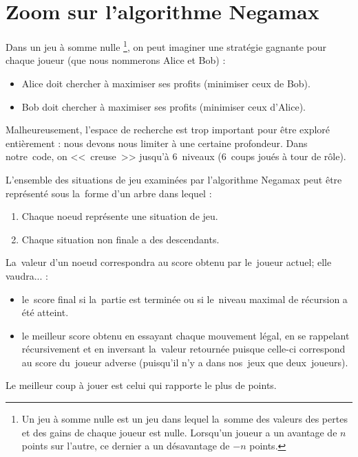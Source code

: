 \section{Zoom sur l'algorithme Negamax}

Dans un jeu à somme nulle
\footnote{Un jeu à somme nulle est un jeu dans lequel la~somme des valeurs des pertes et des gains de chaque joueur est nulle. Lorsqu'un joueur a un avantage de $n$ points sur l'autre, ce dernier a un désavantage de $-n$ points.}, 
on peut imaginer une stratégie gagnante pour chaque joueur (que nous nommerons Alice et Bob) : 
\begin{itemize}
	\item Alice doit chercher à maximiser ses profits (minimiser ceux de Bob).
	\item Bob doit chercher à maximiser ses profits (minimiser ceux d'Alice).
\end{itemize}

Malheureusement, l'espace de recherche est trop important pour être exploré entièrement : 
nous devons nous limiter à une certaine profondeur. Dans notre~code, on <<~creuse~>> jusqu'à 
6~niveaux (6~coups joués à tour de rôle).

L'ensemble des situations de jeu examinées par l'algorithme Negamax 
peut être représenté sous la~forme d'un arbre dans lequel :
\begin{enumerate}
	\item Chaque noeud représente une situation de jeu.
    \item Chaque situation non finale a des descendants.
\end{enumerate}

La~valeur d'un noeud correspondra au score obtenu par le~joueur actuel; elle vaudra... :
\begin{itemize}
	\item le~score final si la~partie est terminée ou si le~niveau maximal de récursion a été atteint.
    \item le meilleur score obtenu en essayant chaque mouvement légal, en se rappelant récursivement 
            et en inversant la~valeur retournée puisque celle-ci correspond au score du~joueur adverse 
            (puisqu'il n'y a dans nos~jeux que deux~joueurs).
\end{itemize}

Le meilleur coup à jouer est celui qui rapporte le plus de points.